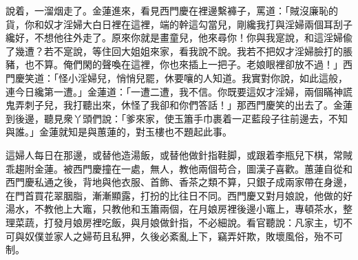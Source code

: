 說着，一溜烟走了。金蓮進來，看見西門慶在裡邊繫褲子，罵道：「賊沒廉恥的貨，你和奴才淫婦大白日裡在這裡，端的幹這勾當兒，剛纔我打與淫婦兩個耳刮子纔好，不想他往外走了。原來你就是畫童兒，他來尋你！你與我寔說，和這淫婦偸了幾遭？若不寔說，等住回大姐姐來家，看我說不說。我若不把奴才淫婦臉打的脹豬，也不算。俺們閑的聲喚在這裡，你也來插上一把子。{}老娘眼裡卻放不過！」西門慶笑道：「怪小淫婦兒，悄悄兒罷，休要嚷的人知道。我實對你說，如此這般，連今日纔第一遭。」金蓮道：「一遭二遭，我不信。你既要這奴才淫婦，兩個瞞神謊鬼弄刺子兒，我打聽出來，休怪了我卻和你們答話！」那西門慶笑的出去了。金蓮到後邊，聽見衆丫頭們說：「爹來家，使玉簫手巾裹着一疋藍段子往前邊去，不知與誰。」金蓮就知是與蕙蓮的，對玉樓也不題起此事。

這婦人每日在那邊，或替他造湯飯，或替他做針指鞋脚，或跟着李瓶兒下棋，常賊乖趨附金蓮。被西門慶撞在一處，無人，教他兩個苟合，圖漢子喜歡。蕙蓮自從和西門慶私通之後，背地與他衣服、首飾、香茶之類不算，只銀子成兩家帶在身邊，在門首買花翠胭脂，漸漸顯露，打扮的比往日不同。西門慶又對月娘說，他做的好湯水，不教他上大竈，只教他和玉簫兩個，在月娘房裡後邊小竈上，專頓茶水，整理菜蔬，打發月娘房裡吃飯，與月娘做針指，不必細說。看官聽說：凡家主，切不可與奴僕並家人之婦苟且私狎，久後必紊亂上下，竊弄奸欺，敗壞風俗，殆不可制。

